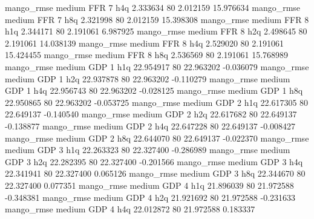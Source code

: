        mango_rmse     medium      FFR                 7                  h4q  2.333634 80       2.012159          15.976634
       mango_rmse     medium      FFR                 7                  h8q  2.321998 80       2.012159          15.398308
       mango_rmse     medium      FFR                 8                  h1q  2.344171 80       2.191061           6.987925
       mango_rmse     medium      FFR                 8                  h2q  2.498645 80       2.191061          14.038139
       mango_rmse     medium      FFR                 8                  h4q  2.529020 80       2.191061          15.424455
       mango_rmse     medium      FFR                 8                  h8q  2.536569 80       2.191061          15.768989
       mango_rmse     medium      GDP                 1                  h1q 22.954917 80      22.963202          -0.036079
       mango_rmse     medium      GDP                 1                  h2q 22.937878 80      22.963202          -0.110279
       mango_rmse     medium      GDP                 1                  h4q 22.956743 80      22.963202          -0.028125
       mango_rmse     medium      GDP                 1                  h8q 22.950865 80      22.963202          -0.053725
       mango_rmse     medium      GDP                 2                  h1q 22.617305 80      22.649137          -0.140540
       mango_rmse     medium      GDP                 2                  h2q 22.617682 80      22.649137          -0.138877
       mango_rmse     medium      GDP                 2                  h4q 22.647228 80      22.649137          -0.008427
       mango_rmse     medium      GDP                 2                  h8q 22.644070 80      22.649137          -0.022370
       mango_rmse     medium      GDP                 3                  h1q 22.263323 80      22.327400          -0.286989
       mango_rmse     medium      GDP                 3                  h2q 22.282395 80      22.327400          -0.201566
       mango_rmse     medium      GDP                 3                  h4q 22.341941 80      22.327400           0.065126
       mango_rmse     medium      GDP                 3                  h8q 22.344670 80      22.327400           0.077351
       mango_rmse     medium      GDP                 4                  h1q 21.896039 80      21.972588          -0.348381
       mango_rmse     medium      GDP                 4                  h2q 21.921692 80      21.972588          -0.231633
       mango_rmse     medium      GDP                 4                  h4q 22.012872 80      21.972588           0.183337
